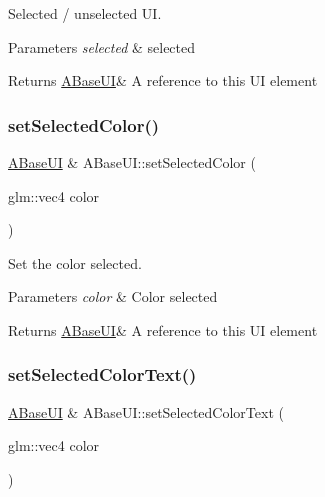Selected / unselected UI. 


\begin{DoxyParams}{Parameters}
{\em selected} & selected \\
\hline
\end{DoxyParams}
\begin{DoxyReturn}{Returns}
\hyperlink{class_a_base_u_i}{A\+Base\+UI}\& A reference to this UI element 
\end{DoxyReturn}
\mbox{\label{class_a_base_u_i_a048cb78b3a5c32aa7ab844ffa445d7a5}} 
\subsubsection{\texorpdfstring{set\+Selected\+Color()}{setSelectedColor()}}
{\footnotesize\ttfamily \hyperlink{class_a_base_u_i}{A\+Base\+UI} \& A\+Base\+U\+I\+::set\+Selected\+Color (\begin{DoxyParamCaption}\item[{glm\+::vec4}]{color }\end{DoxyParamCaption})\hspace{0.3cm}{\ttfamily [virtual]}}



Set the color selected. 


\begin{DoxyParams}{Parameters}
{\em color} & Color selected \\
\hline
\end{DoxyParams}
\begin{DoxyReturn}{Returns}
\hyperlink{class_a_base_u_i}{A\+Base\+UI}\& A reference to this UI element 
\end{DoxyReturn}
\mbox{\label{class_a_base_u_i_a5843ff5ba45830356043a6fefc24f798}} 
\subsubsection{\texorpdfstring{set\+Selected\+Color\+Text()}{setSelectedColorText()}}
{\footnotesize\ttfamily \hyperlink{class_a_base_u_i}{A\+Base\+UI} \& A\+Base\+U\+I\+::set\+Selected\+Color\+Text (\begin{DoxyParamCaption}\item[{glm\+::vec4}]{color }\end{DoxyParamCaption})\hspace{0.3cm}{\ttfamily [virtual]}}



